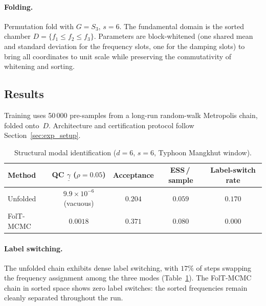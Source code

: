 \paragraph{Folding.}
Permutation fold with $G = S_3$, $s = 6$.  The fundamental domain
is the sorted chamber $D = \{f_1 \leq f_2 \leq f_3\}$.
Parameters are block-whitened (one shared mean and standard
deviation for the frequency slots, one for the damping slots) to
bring all coordinates to unit scale while preserving the
commutativity of whitening and sorting.


\subsection{Results}
\label{sec:app_results}

Training uses 50\,000 pre-samples from a long-run random-walk
Metropolis chain, folded onto~$D$.  Architecture and certification
protocol follow Section~\ref{sec:exp_setup}.

\begin{table}[t]
\centering
\caption{Structural modal identification
  ($d = 6$, $s = 6$, Typhoon Mangkhut window).}
\label{tab:structural}
\smallskip
\begin{tabular}{lcccc}
\hline
Method & QC $\underline{\gamma}$ ($\rho{=}0.05$)
       & Acceptance & ESS\,/\,sample & Label-switch rate \\
\hline
Unfolded & $9.9 \times 10^{-6}$ (vacuous)
         & $0.204$ & $0.059$ & $0.170$ \\
FolT-MCMC & $0.0018$
          & $0.371$ & $0.080$ & $0.000$ \\
\hline
\end{tabular}
\end{table}


\paragraph{Label switching.}
The unfolded chain exhibits dense label switching, with $17\%$
of steps swapping the frequency assignment among the three modes
(Table~\ref{tab:structural}).
The FolT-MCMC chain in sorted space shows zero label switches:
the sorted frequencies remain cleanly separated throughout the run.

